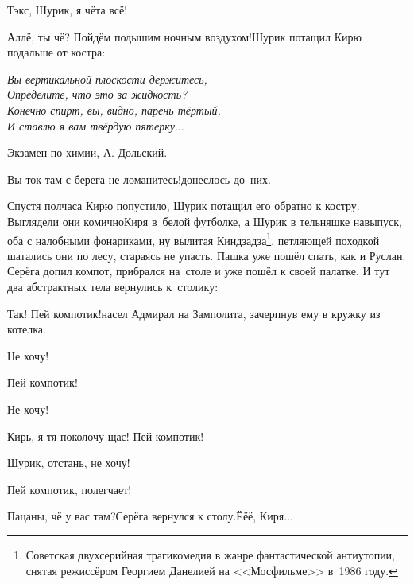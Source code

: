 \diagdash Тэк\sdash с, Шурик, я чёта всё!

\diagdash Аллё, ты чё? Пойдём подышим ночным воздухом!\mdash Шурик потащил Кирю подальше от костра:

\vspace{0.1cm}
\noindent\textit{%
	\hspace*{2.0cm}Вы вертикальной плоскости держитесь,\\	
	\hspace*{2.0cm}Определите, что это за жидкость?\\	
	\hspace*{2.0cm}Конечно спирт, вы, видно, парень тёртый,\\	
	\hspace*{2.0cm}И ставлю я вам твёрдую пятерку$\ldots$	
}

{\raggedleft \scriptsize \mdash Экзамен по химии, А. Дольский. \par}

\vspace{0.1cm}

\diagdash Вы ток там с берега не ломанитесь!\mdash донеслось до~них.

\renewcommand*{\thefootnote}{\fnsymbol{footnote}}
\setcounter{footnote}{0}
Спустя полчаса Кирю попустило, Шурик потащил его обратно к костру. Выглядели они комично\mdash Киря в~белой футболке, а Шурик в тельняшке навыпуск, оба с налобными фонариками, ну вылитая Кин\sdash дза\sdash дза\footnote{Советская двухсерийная трагикомедия в жанре фантастической антиутопии, снятая режиссёром Георгием Данелией на <<Мосфильме>> в~1986 году.}, петляющей походкой шатались они по лесу, стараясь не упасть. Пашка уже пошёл спать, как и Руслан. Серёга допил компот, прибрался на~столе и уже пошёл к своей палатке. И тут два абстрактных тела вернулись к~столику:

\diagdash Так! Пей компотик!\mdash насел Адмирал на Замполита, зачерпнув ему в кружку из котелка.

\diagdash Не хочу!

\diagdash Пей компотик!

\diagdash Не хочу!

\diagdash Кирь, я тя поколочу щас! Пей компотик!

\diagdash Шурик, отстань, не хочу!

\diagdash Пей компотик, полегчает!

\diagdash Пацаны, чё у вас там?\mdash Серёга вернулся к столу.\mdash Ё\sdash ё\sdash ё, Киря$\ldots$


